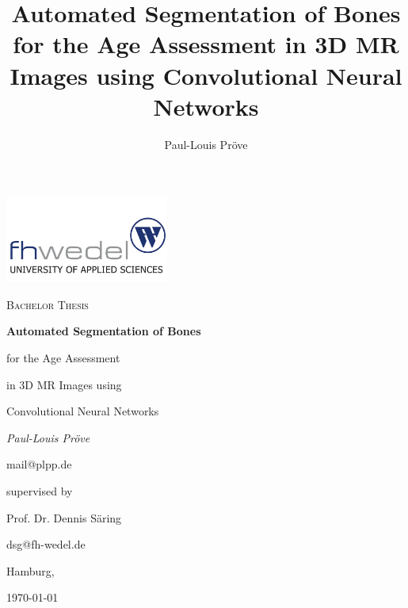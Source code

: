 \documentclass[11pt, a4paper]{article}
\title{Automated Segmentation of Bones for the Age Assessment in 3D MR Images using Convolutional Neural Networks}
\author{Paul-Louis Pröve}
\begin{document}
    \begin{titlepage}
    \centering
    \includegraphics[width=0.4\textwidth]{imgs/fhw.png}\par
    \vspace{1cm}
    {\scshape\Large Bachelor Thesis\par}
    \vspace{2cm}
    {\bfseries\huge Automated Segmentation of Bones \par for the Age Assessment \par in 3D MR Images using \par Convolutional Neural Networks\par}
    \vspace{2cm}
    {\itshape\Large Paul-Louis Pröve\par}
    mail@plpp.de\par
    \vfill
    supervised by\par
    Prof. Dr. Dennis Säring\par
    dsg@fh-wedel.de\par
    \vspace{1cm}
    Hamburg,\par \today\par
    \end{titlepage}



\tableofcontents
\newpage

\listoffigures
\listoftables
\newpage











\end{document}
